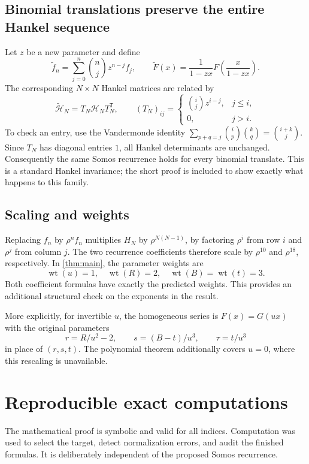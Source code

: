 \documentclass[11pt,a4paper]{article}
\numberwithin{equation}{section}
\theoremstyle{definition}
\begin{document}
\subsection{Binomial translations preserve the entire Hankel sequence}
Let $z$ be a new parameter and define
\[
 \widetilde f_n=\sum_{j=0}^{n}\binom nj z^{n-j}f_j,
 \qquad
 \widetilde F(x)=\frac1{1-zx}F\!\left(\frac{x}{1-zx}\right).
\]
The corresponding $N\times N$ Hankel matrices are related by
\[
 \widetilde{\mathcal H}_N=T_N\mathcal H_NT_N^{\mathsf T},\qquad
 (T_N)_{ij}=\begin{cases}\binom ij z^{i-j},&j\leq i,\\0,&j>i.\end{cases}
\]
To check an entry, use the Vandermonde identity
$\sum_{p+q=j}\binom ip\binom kq=\binom{i+k}j$. Since $T_N$ has diagonal
entries $1$, all Hankel determinants are unchanged. Consequently the same
Somos recurrence holds for every binomial translate. This is a standard
Hankel invariance; the short proof is included to show exactly what happens
to this family.

\subsection{Scaling and weights}
Replacing $f_n$ by $\rho^nf_n$ multiplies $H_N$ by
$\rho^{N(N-1)}$, by factoring $\rho^i$ from row $i$ and $\rho^j$ from column
$j$. The two recurrence coefficients therefore scale by $\rho^{10}$ and
$\rho^{18}$, respectively. In \cref{thm:main}, the parameter weights are
\[
 \operatorname{wt}(u)=1,\quad \operatorname{wt}(R)=2,\quad
 \operatorname{wt}(B)=\operatorname{wt}(t)=3.
\]
Both coefficient formulas have exactly the predicted weights. This provides
an additional structural check on the exponents in the result.

More explicitly, for invertible $u$, the homogeneous series is
$F(x)=G(ux)$ with the original parameters
\[
 r=R/u^2-2,\qquad s=(B-t)/u^3,\qquad \tau=t/u^3
\]
in place of $(r,s,t)$. The polynomial theorem additionally covers $u=0$,
where this rescaling is unavailable.

\section{Reproducible exact computations}

The mathematical proof is symbolic and valid for all indices. Computation
was used to select the target, detect normalization errors, and audit the
finished formulas. It is deliberately independent of the proposed Somos
recurrence.
\end{document}
